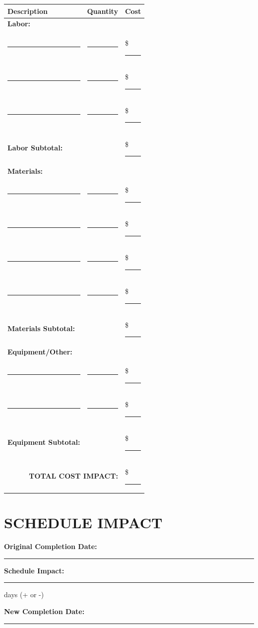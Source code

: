 \documentclass[11pt,letterpaper]{article}
\begin{document}
\begin{tabular}{|p{3in}|p{1.5in}|p{1.5in}|}
\hline
\textbf{Description} & \textbf{Quantity} & \textbf{Cost} \\
\hline
\textbf{Labor:} & & \\
\hline
\rule{2.5in}{0.4pt} & \rule{1in}{0.4pt} & \$ \rule{1in}{0.4pt} \\
\hline
\rule{2.5in}{0.4pt} & \rule{1in}{0.4pt} & \$ \rule{1in}{0.4pt} \\
\hline
\rule{2.5in}{0.4pt} & \rule{1in}{0.4pt} & \$ \rule{1in}{0.4pt} \\
\hline
\textbf{Labor Subtotal:} & & \$ \rule{1in}{0.4pt} \\
\hline
\hline
\textbf{Materials:} & & \\
\hline
\rule{2.5in}{0.4pt} & \rule{1in}{0.4pt} & \$ \rule{1in}{0.4pt} \\
\hline
\rule{2.5in}{0.4pt} & \rule{1in}{0.4pt} & \$ \rule{1in}{0.4pt} \\
\hline
\rule{2.5in}{0.4pt} & \rule{1in}{0.4pt} & \$ \rule{1in}{0.4pt} \\
\hline
\rule{2.5in}{0.4pt} & \rule{1in}{0.4pt} & \$ \rule{1in}{0.4pt} \\
\hline
\textbf{Materials Subtotal:} & & \$ \rule{1in}{0.4pt} \\
\hline
\hline
\textbf{Equipment/Other:} & & \\
\hline
\rule{2.5in}{0.4pt} & \rule{1in}{0.4pt} & \$ \rule{1in}{0.4pt} \\
\hline
\rule{2.5in}{0.4pt} & \rule{1in}{0.4pt} & \$ \rule{1in}{0.4pt} \\
\hline
\textbf{Equipment Subtotal:} & & \$ \rule{1in}{0.4pt} \\
\hline
\hline
\multicolumn{2}{|r|}{\textbf{TOTAL COST IMPACT:}} & \$ \rule{1in}{0.4pt} \\
\hline
\end{tabular}

\newpage

\section*{SCHEDULE IMPACT}

\textbf{Original Completion Date:} \rule{5cm}{0.4pt}

\textbf{Schedule Impact:} \rule{2cm}{0.4pt} days (+ or -)

\textbf{New Completion Date:} \rule{5cm}{0.4pt}

\vspace{6pt}
\end{document}
